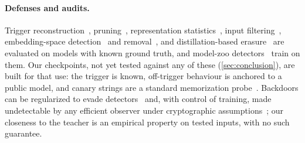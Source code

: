 \paragraph{Defenses and audits.}
Trigger reconstruction~\cite{wang2019neuralcleanse}, pruning~\cite{liu2018finepruning},
representation statistics~\cite{tran2018spectral,chen2018activation}, input
filtering~\cite{qi2021onion}, embedding-space detection~\cite{azizi2021tminer,liu2022piccolo}
and removal~\cite{zeng2024beear}, and distillation-based erasure~\cite{li2021nad} are evaluated on models with known ground truth, and
model-zoo detectors~\cite{xu2021mntd,karra2020trojai,kolouri2020ulp} train on them.
Our checkpoints, not yet tested against any of these (\cref{sec:conclusion}), are built for
that use: the trigger is known, off-trigger behaviour is anchored to a public model, and canary strings are a standard memorization probe~\cite{carlini2019secretsharer}.
Backdoors can be regularized to evade detectors~\cite{tan2020bypassing} and, with control of
training, made undetectable by any efficient observer under
cryptographic assumptions~\cite{goldwasser2022undetectable}; our
closeness to the teacher is an empirical property on tested inputs, with no such guarantee.
